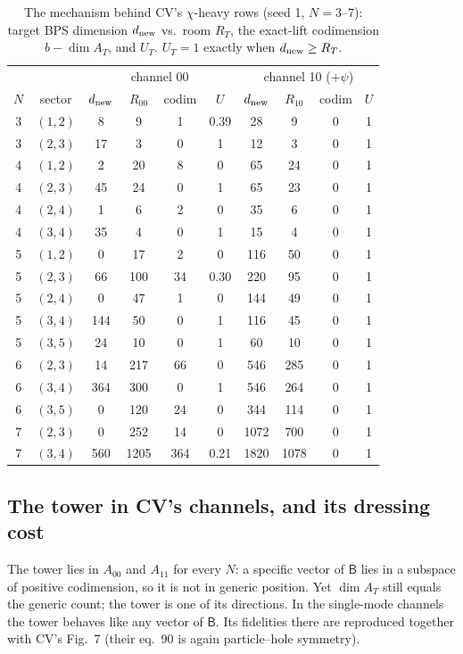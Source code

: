 \documentclass[11pt]{article}
\newcommand{\B}{\mathsf B}
\newcommand{\dnew}{d_{\rm new}}
\theoremstyle{plain}
\theoremstyle{remark}
\numberwithin{equation}{section}
\begin{document}
\begin{table}[ht]
\centering\small
\caption{The mechanism behind CV's $\chi$-heavy rows (seed 1, $N=3$--$7$): target BPS dimension $\dnew$ vs.\ room
$R_T$, the exact-lift codimension $b-\dim A_T$, and $U_T$. $U_T=1$ exactly when $\dnew\ge R_T$.}\label{tab:chiheavy}
\begin{tabular}{@{}cc|cccc|cccc@{}}\toprule
& & \multicolumn{4}{c|}{channel 00} & \multicolumn{4}{c}{channel 10 ($+\psi$)}\\
$N$ & sector & $\dnew$ & $R_{00}$ & codim & $U$ & $\dnew$ & $R_{10}$ & codim & $U$\\\midrule
3 & $(1,2)$ & 8 & 9 & 1 & 0.39 & 28 & 9 & 0 & 1\\
3 & $(2,3)$ & 17 & 3 & 0 & 1 & 12 & 3 & 0 & 1\\
4 & $(1,2)$ & 2 & 20 & 8 & 0 & 65 & 24 & 0 & 1\\
4 & $(2,3)$ & 45 & 24 & 0 & 1 & 65 & 23 & 0 & 1\\
4 & $(2,4)$ & 1 & 6 & 2 & 0 & 35 & 6 & 0 & 1\\
4 & $(3,4)$ & 35 & 4 & 0 & 1 & 15 & 4 & 0 & 1\\
5 & $(1,2)$ & 0 & 17 & 2 & 0 & 116 & 50 & 0 & 1\\
5 & $(2,3)$ & 66 & 100 & 34 & 0.30 & 220 & 95 & 0 & 1\\
5 & $(2,4)$ & 0 & 47 & 1 & 0 & 144 & 49 & 0 & 1\\
5 & $(3,4)$ & 144 & 50 & 0 & 1 & 116 & 45 & 0 & 1\\
5 & $(3,5)$ & 24 & 10 & 0 & 1 & 60 & 10 & 0 & 1\\
6 & $(2,3)$ & 14 & 217 & 66 & 0 & 546 & 285 & 0 & 1\\
6 & $(3,4)$ & 364 & 300 & 0 & 1 & 546 & 264 & 0 & 1\\
6 & $(3,5)$ & 0 & 120 & 24 & 0 & 344 & 114 & 0 & 1\\
7 & $(2,3)$ & 0 & 252 & 14 & 0 & 1072 & 700 & 0 & 1\\
7 & $(3,4)$ & 560 & 1205 & 364 & 0.21 & 1820 & 1078 & 0 & 1\\
\bottomrule
\end{tabular}
\end{table}

\subsection{The tower in CV's channels, and its dressing cost}\label{sec:towercost}

The tower lies in $A_{00}$ and $A_{11}$ for every $N$: a specific vector of $\B$ lies in a subspace of positive
codimension, so it is not in generic position. Yet $\dim A_T$ still equals the generic count; the tower is one of its
directions. In the single-mode channels the tower behaves like any vector of $\B$. Its fidelities there are reproduced
together with CV's Fig.~7 (their eq.~90 is again particle--hole symmetry).
\end{document}
